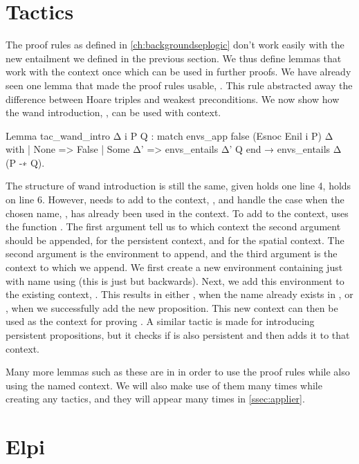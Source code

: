 \documentclass[thesis.tex]{subfiles}
\begin{document}
{\section{Tactics}
The proof rules as defined in \cref{ch:backgroundseplogic} don't work easily with the new entailment we defined in the previous section. We thus define lemmas that work with the context once which can be used in further proofs. We have already seen one lemma that made the proof rules usable, . This rule abstracted away the difference between Hoare triples and weakest preconditions. We now show how the wand introduction, , can be used with context.
\begin{coqcode}
  Lemma tac_wand_intro Δ i P Q :
    match envs_app false (Esnoc Enil i P) Δ with
    | None => False
    | Some Δ' => envs_entails Δ' Q
    end →
    envs_entails Δ (P -∗ Q).
\end{coqcode}
The structure of wand introduction is still the same, given  holds one line 4,  holds on line 6. However, \iris needs to add  to the context, , and handle the case when the chosen name, , has already been used in the context. To add  to the context, \iris uses the function . The first argument tell us to which context the second argument should be appended,  for the persistent context, and  for the spatial context. The second argument is the environment to append, and the third argument is the context to which we append. We first create a new environment containing just  with name  using  (this is just  but backwards). Next, we add this environment to the existing context, . This results in either , when the name already exists in , or , when we successfully add the new proposition. This new context can then be used as the context for proving . A similar tactic is made for introducing persistent propositions, but it checks if  is also persistent and then adds it to that context.

Many more lemmas such as these are in \iris in order to use the proof rules while also using the named context. We will also make use of them many times while creating any tactics, and they will appear many times in \cref{ssec:applier}.

\section{Elpi}

}
\end{document}
